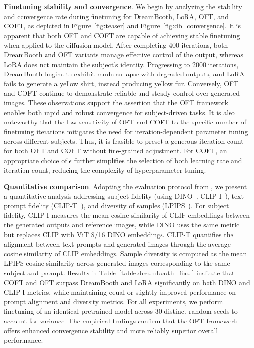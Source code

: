 \textbf{Finetuning stability and convergence}. We begin by analyzing the stability and convergence rate during finetuning for DreamBooth, LoRA, OFT, and COFT, as depicted in Figure~\ref{fig:teaser} and Figure~\ref{fig:db_convergence}. It is apparent that both OFT and COFT are capable of achieving stable finetuning when applied to the diffusion model. After completing 400 iterations, both DreamBooth and OFT variants manage effective control of the output, whereas LoRA does not maintain the subject's identity. Progressing to 2000 iterations, DreamBooth begins to exhibit mode collapse with degraded outputs, and LoRA fails to generate a yellow shirt, instead producing yellow fur. Conversely, OFT and COFT continue to demonstrate reliable and steady control over generated images. These observations support the assertion that the OFT framework enables both rapid and robust convergence for subject-driven tasks. It is also noteworthy that the low sensitivity of OFT and COFT to the specific number of finetuning iterations mitigates the need for iteration-dependent parameter tuning across different subjects. Thus, it is feasible to preset a generous iteration count for both OFT and COFT without fine-grained adjustment. For COFT, an appropriate choice of $\epsilon$ further simplifies the selection of both learning rate and iteration count, reducing the complexity of hyperparameter tuning.

\textbf{Quantitative comparison}. Adopting the evaluation protocol from \cite{ruiz2023dreambooth}, we present a quantitative analysis addressing subject fidelity (using DINO~\cite{caron2021emerging}, CLIP-I~\cite{radford2021learning}), text prompt fidelity (CLIP-T~\cite{radford2021learning}), and diversity of samples (LPIPS~\cite{zhang2018unreasonable}). For subject fidelity, CLIP-I measures the mean cosine similarity of CLIP embeddings between the generated outputs and reference images, while DINO uses the same metric but replaces CLIP with ViT S/16 DINO embeddings. CLIP-T quantifies the alignment between text prompts and generated images through the average cosine similarity of CLIP embeddings. Sample diversity is computed as the mean LPIPS cosine similarity across generated images corresponding to the same subject and prompt. Results in Table~\ref{table:dreambooth_final} indicate that COFT and OFT surpass DreamBooth and LoRA significantly on both DINO and CLIP-I metrics, while maintaining equal or slightly improved performance on prompt alignment and diversity metrics. For all experiments, we perform finetuning of an identical pretrained model across 30 distinct random seeds to account for variance. The empirical findings confirm that the OFT framework offers enhanced convergence stability and more reliably superior overall performance.

